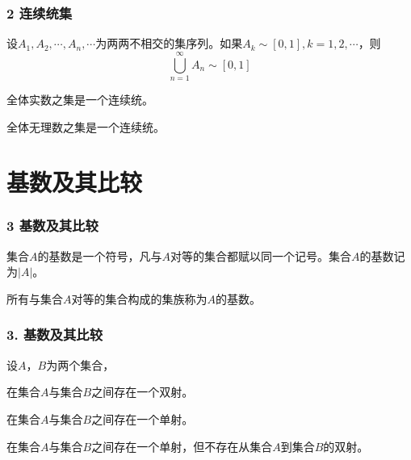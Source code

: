 \documentclass{beamer}
\begin{document}
\begin{CJK*}{UTF8}{gbsn}
\begin{frame}
  \frametitle{2 连续统集}
  \begin{Thm}
    设$A_1, A_2, \cdots, A_n, \cdots$为两两不相交的集序列。如果$A_k \sim [0,1], k = 1, 2, \cdots$，则
    \[\bigcup_{n=1}^{\infty}A_n \sim [0,1]\]
  \end{Thm}\pause
  \begin{Cor}
    全体实数之集是一个连续统。
  \end{Cor}\pause
  \begin{Cor}
    全体无理数之集是一个连续统。
  \end{Cor}
\end{frame}


\section{基数及其比较}
\begin{frame}
  \frametitle{3 基数及其比较}
  \begin{Def}
    集合$A$的基数是一个符号，凡与$A$对等的集合都赋以同一个记号。集合$A$的基数记为$|A|$。
  \end{Def}\pause
  \begin{Def}
    所有与集合$A$对等的集合构成的集族称为$A$的基数。
  \end{Def}
\end{frame}
\begin{frame}
  \frametitle{3. 基数及其比较}
  设$A$，$B$为两个集合，
  \begin{description}
  \pause\item[$|A|=|B|:$]在集合$A$与集合$B$之间存在一个双射。
  \pause\item[$|A|\leq |B|:$]在集合$A$与集合$B$之间存在一个单射。
  \pause\item[$|A|< |B|:$]在集合$A$与集合$B$之间存在一个单射，但不存在从集合$A$到集合$B$的双射。
  \end{description}
\end{frame}


\end{CJK*}
\end{document}
